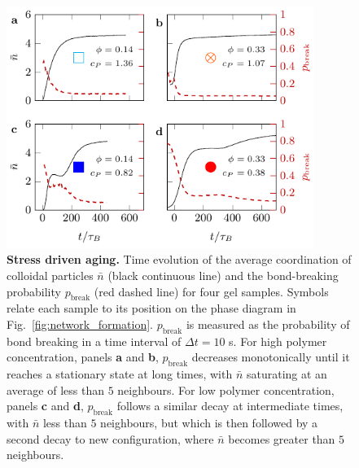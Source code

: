 \documentclass[preprint,amsmath,amssymb,superscriptaddress]{revtex4-1}
\begin{document}
\begin{figure}
 \includegraphics[width=10cm]{bond_breaking.pdf}
 \caption{{\bf Stress driven aging.} Time evolution of the average coordination of colloidal particles $\bar{n}$ (black continuous line) and the bond-breaking probability $p_\text{break}$ (red dashed line) for four gel samples. Symbols relate each sample to its position on the phase diagram in Fig.~\ref{fig:network_formation}. $p_\text{break}$ is measured as the probability of bond breaking in a time interval of $\Delta t=10$ s. For high polymer concentration, panels {\bf a} and {\bf b}, $p_\text{break}$ decreases monotonically until it reaches a stationary state at long times, with $\bar{n}$ saturating at an average of less than $5$ neighbours. For low polymer concentration, panels {\bf c} and {\bf d}, $p_\text{break}$ follows a similar decay at intermediate times, with $\bar{n}$ less than $5$ neighbours, but which is then followed by a second decay to new configuration, where $\bar{n}$ becomes greater than $5$ neighbours.}
 \label{fig:bond_breaking}
\end{figure}
\end{document}
